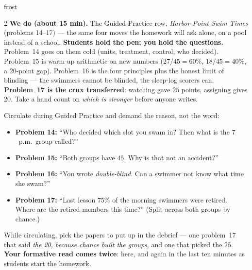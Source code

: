 \documentclass[10pt]{article}
\begin{document}
\begin{skillbox}{frost}
\begin{multicols}{2}
\columnbreak
\textbf{We do (about 15 min).} The Guided Practice row, \emph{Harbor Point Swim Times}
(problems 14--17) --- the same four moves the homework will ask alone, on a pool instead of a
school. \textbf{Students hold the pen; you hold the questions.} Problem~14 goes on them cold
(units, treatment, control, who decided). Problem~15 is warm-up arithmetic on new numbers
($27/45 = 60\%$, $18/45 = 40\%$, a $20$-point gap). Problem~16 is the four principles plus the
honest limit of blinding --- the swimmers cannot be blinded, the sleep-log scorers can.
\textbf{Problem~17 is the crux transferred}: watching gave $25$ points, assigning gives $20$.
Take a hand count on \emph{which is stronger} before anyone writes.

Circulate during Guided Practice and demand the reason, not the word:
\begin{itemize}[leftmargin=1.1em, nosep]
  \item \textbf{Problem 14:} ``Who decided which slot you swam in? Then what is the $7$~p.m.\
        group called?''
  \item \textbf{Problem 15:} ``Both groups have $45$. Why is that not an accident?''
  \item \textbf{Problem 16:} ``You wrote \emph{double-blind}. Can a swimmer not know what time
        she swam?''
  \item \textbf{Problem 17:} ``Last lesson $75\%$ of the morning swimmers were retired. Where
        are the retired members this time?'' (Split across both groups by chance.)
\end{itemize}
While circulating, pick the papers to put up in the debrief --- one problem~17 that said
\emph{the 20, because chance built the groups}, and one that picked the $25$. \textbf{Your
formative read comes twice}: here, and again in the last ten minutes as students start the
homework.
\end{multicols}
\end{skillbox}
\end{document}
